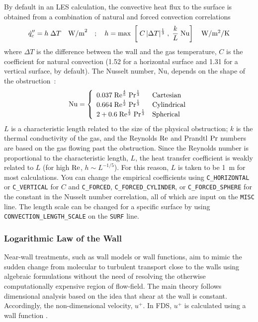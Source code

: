 \documentclass[11pt]{book}
\newcommand{\ct}{\tt\small}
\newcommand{\dq}{\dot{q}}
\newcommand{\ha}{\frac{1}{2}}
\newcommand{\ot}{\frac{1}{3}}
\newcommand{\fofi}{\frac{4}{5}}
\newcommand{\be}{\begin{equation}}
\newcommand{\ee}{\end{equation}}
\newcommand{\RE}{\hbox{Re}}
\newcommand{\PR}{\hbox{Pr}}
\newcommand{\NU}{\hbox{Nu}}
\begin{document}
By default in an LES calculation, the convective heat flux to the surface is
obtained from a combination of natural and forced
convection correlations
\be \dq_c'' = h \; \Delta T
    \quad \hbox{W/m}^2 \quad ; \quad h =
    \max \; \left[ \; C \, |\Delta T|^\ot \; , \;
            \frac{k}{L} \; \NU
            \right]  \quad
    \hbox{W/m$^2$/K} \ee
where $\Delta T$ is the difference between the wall and the gas temperature,
$C$ is the coefficient for natural convection (1.52 for a horizontal surface
and 1.31 for a vertical surface, by default). The Nusselt number, Nu, depends on the shape of the obstruction~\cite{Holman:1}:
\be \NU = \left\{ \begin{array}{ll} 0.037 \; \RE^\fofi \; \PR^\ot & \hbox{Cartesian} \\
                                    0.664 \; \RE^\ha \; \PR^\ot & \hbox{Cylindrical} \\
                                    2 + 0.6 \; \RE^\ha \; \PR^\ot & \hbox{Spherical} \end{array} \right. \ee
$L$ is a characteristic length related to the size of the physical
obstruction; $k$ is the thermal conductivity of the
gas, and the Reynolds $\RE$ and Prandtl $\PR$ numbers are based on the
gas flowing past the obstruction. Since the Reynolds number is proportional to the
characteristic length, $L$, the heat transfer coefficient is weakly
related to $L$ (for high $\RE$, $h \sim L^{-1/5}$). For this reason, $L$ is taken to be 1~m for most
calculations. You can change the empirical coefficients using {\ct C\_HORIZONTAL} or {\ct C\_VERTICAL} for $C$ and
{\ct C\_FORCED}, {\ct C\_FORCED\_CYLINDER}, or {\ct C\_FORCED\_SPHERE} for the constant in the Nusselt number correlation, all of which are input on the {\ct MISC} line.  The length scale can be changed for a specific surface by using {\ct CONVECTION\_LENGTH\_SCALE} on the {\ct SURF} line.

\subsubsection{Logarithmic Law of the Wall}

\noindent Near-wall treatments, such as wall models or wall functions, aim to mimic the sudden change from molecular to turbulent transport close to the walls using algebraic formulations without the need of resolving the otherwise computationally expensive region of flow-field. The main theory follows dimensional analysis based on the idea that shear at the wall is constant. Accordingly, the non-dimensional velocity, $u^+$. In FDS, $u^+$ is calculated using a wall function \cite{FDS_Tech_Guide}.
\end{document}

